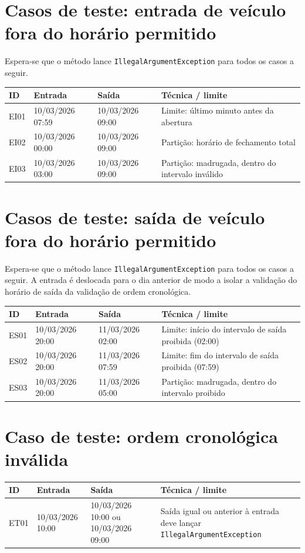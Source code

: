 \documentclass[11pt,a4paper]{article}
\begin{document}
\section*{Casos de teste: entrada de veículo fora do horário permitido}

Espera-se que o método lance \texttt{IllegalArgumentException} para todos os casos
a seguir.

\begin{longtable}{@{}p{1.4cm}p{2.8cm}p{2.8cm}p{6.2cm}@{}}
\toprule
\textbf{ID} & \textbf{Entrada} & \textbf{Saída} & \textbf{Técnica / limite} \\
\midrule
\endhead
EI01 & 10/03/2026 07:59 & 10/03/2026 09:00 & Limite: último minuto antes da abertura \\
EI02 & 10/03/2026 00:00 & 10/03/2026 09:00 & Partição: horário de fechamento total \\
EI03 & 10/03/2026 03:00 & 10/03/2026 09:00 & Partição: madrugada, dentro do intervalo inválido \\
\bottomrule
\end{longtable}

\section*{Casos de teste: saída de veículo fora do horário permitido}

Espera-se que o método lance \texttt{IllegalArgumentException} para todos os casos
a seguir. A entrada é deslocada para o dia anterior de modo a isolar a validação do
horário de saída da validação de ordem cronológica.

\begin{longtable}{@{}p{1.4cm}p{2.8cm}p{2.8cm}p{6.2cm}@{}}
\toprule
\textbf{ID} & \textbf{Entrada} & \textbf{Saída} & \textbf{Técnica / limite} \\
\midrule
\endhead
ES01 & 10/03/2026 20:00 & 11/03/2026 02:00 & Limite: início do intervalo de saída proibida (02:00) \\
ES02 & 10/03/2026 20:00 & 11/03/2026 07:59 & Limite: fim do intervalo de saída proibida (07:59) \\
ES03 & 10/03/2026 20:00 & 11/03/2026 05:00 & Partição: madrugada, dentro do intervalo proibido \\
\bottomrule
\end{longtable}

\section*{Caso de teste: ordem cronológica inválida}

\begin{longtable}{@{}p{1.4cm}p{2.8cm}p{2.8cm}p{6.2cm}@{}}
\toprule
\textbf{ID} & \textbf{Entrada} & \textbf{Saída} & \textbf{Técnica / limite} \\
\midrule
\endhead
ET01 & 10/03/2026 10:00 & 10/03/2026 10:00 ou 10/03/2026 09:00 & Saída igual ou anterior à entrada deve lançar \texttt{IllegalArgumentException} \\
\bottomrule
\end{longtable}
\end{document}
